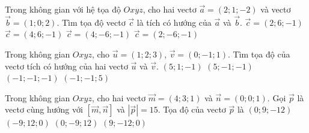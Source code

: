 \begin{ex}%
	Trong không gian với hệ tọa độ $Oxyz$, cho hai  vectơ $\overrightarrow{a} = (2;1;-2)$ và vectơ $\overrightarrow{b} = (1;0;2)$. Tìm tọa độ vectơ $\overrightarrow{c}$ là tích có hướng của $\overrightarrow{a}$ và $\overrightarrow{b}$.
	\choice 
		 {$\overrightarrow{c} = (2;6;-1)$}
		{$\overrightarrow{c} =  (4;6;-1)$}
		{$\overrightarrow{c}  = (4;-6;-1)$}
		{\True $\overrightarrow{c}  = (2;-6;-1)$}
\end{ex}

\begin{ex}%
	 Trong không gian $Oxyz$, cho $\overrightarrow{u}=(1;2;3)$, $\overrightarrow{v}=(0;-1;1)$. Tìm tọa độ của vectơ tích có hướng của hai vectơ $\overrightarrow{u}$ và $\overrightarrow{v}$.
	\choice 
		 {$(5;1;-1)$}
		{\True  $(5;-1;-1)$}
		{$(-1;-1;-1)$} 
		 {$(-1;-1;5)$}
\end{ex}

\begin{ex}%
	Trong không gian $Oxyz$, cho hai vectơ $\overrightarrow{m}=(4;3;1)$ và $\overrightarrow{n}=(0;0;1)$. Gọi $\overrightarrow{p}$ là vectơ cùng hướng với $\left[\overrightarrow{m}, \overrightarrow{n}\right]$ và $\left| \overrightarrow{p}\right|=15$. Tọa độ của vectơ  $\overrightarrow{p}$ là
	 \choice
		 {$(0;9;-12)$}
		{$(-9;12;0)$} 
		 {$(0;-9;12)$}
		 {\True $(9;-12;0)$}
\end{ex}

